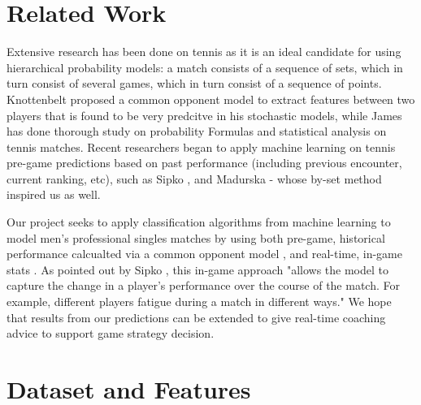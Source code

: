 \documentclass[paper=a4, fontsize=10pt]{scrartcl} %
\numberwithin{equation}{section} %
\numberwithin{figure}{section} %
\numberwithin{table}{section} %
\begin{document}
\section{Related Work}
Extensive research has been done on tennis as it is an ideal candidate for using hierarchical probability models: a match consists of a sequence of sets, which in turn consist of several games, which in turn consist of a sequence of points. Knottenbelt \cite{KNOTTENBELT20123820} proposed a common opponent model to extract features between two players that is found to be very predcitve in his stochastic models, while James \cite{omalley} has done thorough study on probability Formulas and statistical analysis on tennis matches. Recent researchers began to apply machine learning on tennis pre-game predictions based on past performance (including previous encounter, current ranking, etc), such as Sipko \cite{tennis1}, and Madurska \cite{tennis2setbyset} - whose by-set method inspired us as well. 

Our project seeks to apply classification algorithms from machine learning to model men's professional singles matches by using both pre-game, historical performance calcualted via a common opponent model \cite{KNOTTENBELT20123820}, and real-time, in-game stats \cite{tennis_charting} \cite{tennis2setbyset}. As pointed out by Sipko \cite{tennis1}, this in-game approach "allows the model to capture the change in a player's performance over the course of the match. For example, different players fatigue during a match in different ways." We hope that results from our predictions can be extended to give real-time coaching advice to support game strategy decision.

\section{Dataset and Features}
\end{document}
